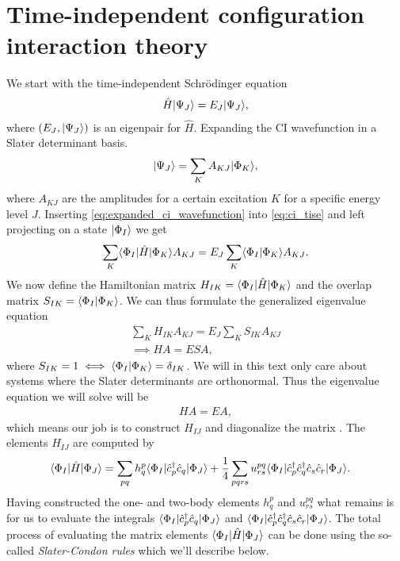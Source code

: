      \section{Time-independent configuration interaction theory}
        We start with the time-independent Schrödinger equation
        \begin{align}
            \hat{H}| \Psi_J \rangle = E_J| \Psi_J \rangle,
            \label{eq:ci_tise}
        \end{align}
        where $(E_J, | \Psi_J \rangle)$ is an eigenpair for $\hat{H}$. Expanding the
        CI wavefunction in a Slater determinant basis.
        \begin{align}
            | \Psi_J \rangle = \sum_{K} A_{KJ}| \Phi_K \rangle,
            \label{eq:expanded_ci_wavefunction}
        \end{align}
        where $A_{KJ}$ are the amplitudes for a certain excitation $K$ for a
        specific energy level $J$. Inserting
        \autoref{eq:expanded_ci_wavefunction} into \autoref{eq:ci_tise} and left
        projecting on a state $| \Phi_I \rangle$ we get
        \begin{align}
            \sum_{K}\langle \Phi_I |\hat{H}| \Phi_K \rangle A_{KJ}
            = E_J\sum_{K}\langle \Phi_I | \Phi_K \rangle A_{KJ}.
        \end{align}
        We now define the Hamiltonian matrix $H_{IK} =
        \langle \Phi_I |\hat{H}| \Phi_K \rangle$ and the overlap matrix $S_{IK} =
        \langle \Phi_I | \Phi_K \rangle$. We can thus formulate the generalized
        eigenvalue equation
        \begin{gather}
            \sum_{K}H_{IK}A_{KJ} = E_J\sum_{K}S_{IK}A_{KJ}
            \\
            \implies
            HA = ESA,
        \end{gather}
        where $S_{IK} = 1 \iff \langle \Phi_I | \Phi_K \rangle = \delta_{IK}$. We will
        in this text only care about systems where the Slater determinants are
        orthonormal. Thus the eigenvalue equation we will solve will be
        \begin{align}
            HA = EA,
        \end{align}
        which means our job is to construct $H_{IJ}$ and diagonalize the
        matrix \cite{karwowski}. The elements $H_{IJ}$ are computed by
        \begin{align}
            \langle \Phi_I |\hat{H}| \Phi_J \rangle
            &= \sum_{pq}h^{p}_{q}
            \langle \Phi_I |\hat{c}_{p}^{\dagger}\hat{c}_{q}| \Phi_J \rangle
            + \frac{1}{4}\sum_{pqrs}u^{pq}_{rs}
            \langle \Phi_I |\hat{c}_{p}^{\dagger}\hat{c}_{q}^{\dagger}\hat{c}_{s}\hat{c}_{r}| \Phi_J \rangle.
        \end{align}
        Having constructed the one- and two-body elements $h^{p}_{q}$ and
        $u^{pq}_{rs}$ what remains is for us to evaluate the integrals
        $\langle \Phi_I |\hat{c}_{p}^{\dagger}\hat{c}_{q}| \Phi_J \rangle$ and
        $\langle \Phi_I |\hat{c}_{p}^{\dagger}\hat{c}_{q}^{\dagger}\hat{c}_{s}\hat{c}_{r}| \Phi_J \rangle$. The total
        process of evaluating the matrix elements
        $\langle \Phi_I |\hat{H}| \Phi_J \rangle$ can be done using the so-called
        \emph{Slater-Condon rules} which we'll describe below.

